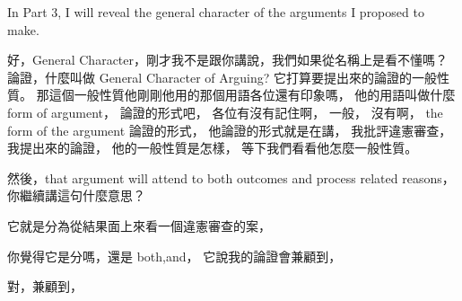 \hypertarget{w06:cue:413}{}In Part 3, I will reveal the general character of the arguments I proposed to make.

\hypertarget{w06:cue:414}{}好，General Character，剛才我不是跟你講說，我們如果從名稱上是看不懂嗎？
\hypertarget{w06:cue:415}{}論證，什麼叫做 General Character of Arguing?
\hypertarget{w06:cue:416}{}它打算要提出來的論證的一般性質。
\hypertarget{w06:cue:417}{}那這個一般性質他剛剛他用的那個用語各位還有印象嗎，
\hypertarget{w06:cue:418}{}他的用語叫做什麼 form of argument，
\hypertarget{w06:cue:419}{}論證的形式吧，
\hypertarget{w06:cue:420}{}各位有沒有記住啊，
\hypertarget{w06:cue:421}{}一般，
\hypertarget{w06:cue:422}{}沒有啊，
\hypertarget{w06:cue:423}{}the form of the argument
\hypertarget{w06:cue:424}{}論證的形式，
\hypertarget{w06:cue:425}{}他論證的形式就是在講，
\hypertarget{w06:cue:426}{}我批評違憲審查，我提出來的論證，
\hypertarget{w06:cue:427}{}他的一般性質是怎樣，
\hypertarget{w06:cue:428}{}等下我們看看他怎麼一般性質。

\hypertarget{w06:cue:429}{}然後，that argument will attend to both outcomes and process related reasons，
\hypertarget{w06:cue:430}{}你繼續講這句什麼意思？

\hypertarget{w06:cue:431}{}它就是分為從結果面上來看一個違憲審查的案，

\hypertarget{w06:cue:432}{}你覺得它是分嗎，還是 both,and，
\hypertarget{w06:cue:433}{}它說我的論證會兼顧到，

\hypertarget{w06:cue:434}{}對，兼顧到，

